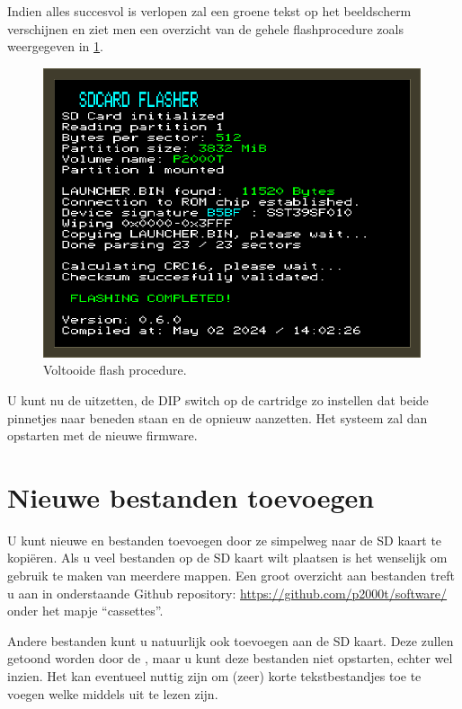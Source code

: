 Indien alles succesvol is verlopen zal een groene tekst op het beeldscherm verschijnen en ziet men een overzicht van de gehele flashprocedure zoals weergegeven in \cref{fig:flasher-done}.


\begin{figure}[h!]
    \centering
    \includegraphics[width=0.99\textwidth]{img/flasher_done.png}
    \caption{Voltooide flash procedure.}
    \label{fig:flasher-done}
\end{figure}

U kunt nu de  uitzetten, de DIP switch op de  cartridge zo instellen dat beide pinnetjes naar beneden staan en de  opnieuw aanzetten. Het systeem zal dan opstarten met de nieuwe firmware.

%
%
%
\section{Nieuwe bestanden toevoegen}


U kunt nieuwe \cas en  bestanden toevoegen door ze simpelweg naar de SD kaart te kopiëren. Als u veel bestanden op de SD kaart wilt plaatsen is het wenselijk om gebruik te maken van meerdere mappen. Een groot overzicht aan \cas bestanden treft u aan in onderstaande Github repository: \url{https://github.com/p2000t/software/}
onder het mapje ``cassettes''.


Andere bestanden kunt u natuurlijk ook toevoegen aan de SD kaart. Deze zullen getoond worden door de \product, maar u kunt deze bestanden niet opstarten, echter wel inzien. Het kan eventueel nuttig zijn om (zeer) korte tekstbestandjes toe te voegen welke middels  uit te lezen zijn.